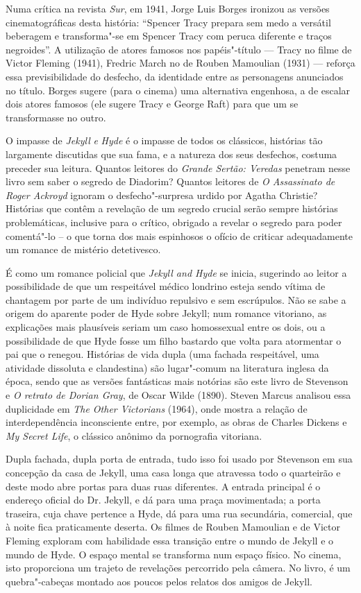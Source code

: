 Numa crítica na revista \textit{Sur}, em 1941, Jorge Luis Borges
ironizou as versões cinematográficas desta história: “Spencer Tracy
prepara sem medo a versátil beberagem e transforma"-se em Spencer Tracy
com peruca diferente e traços negroides”.  A utilização de atores
famosos nos papéis"-título --- Tracy no filme de Victor Fleming (1941),
Fredric March no de Rouben Mamoulian (1931) --- reforça essa
previsibilidade do desfecho, da identidade entre as personagens
anunciados no título. Borges sugere (para o cinema) uma alternativa
engenhosa, a de escalar dois atores famosos (ele sugere Tracy e George
Raft) para que um se transformasse no outro.  

O impasse de \textit{Jekyll }\textit{e}\textit{ Hyde} é o impasse de
todos os clássicos, histórias tão largamente discutidas que sua fama, e
a natureza dos seus desfechos, costuma preceder sua leitura.  Quantos
leitores do \textit{Grande Sertão: Veredas} penetram nesse livro sem
saber o segredo de Diadorim?  Quantos leitores de \textit{O Assassinato
de Roger Ackroyd} ignoram o desfecho"-surpresa urdido por Agatha
\mbox{Christie?}  Histórias que contêm a revelação de um segredo crucial serão
sempre histórias problemáticas, inclusive para o crítico, obrigado a
revelar o segredo para poder comentá"-lo – o que torna dos mais
espinhosos o ofício de criticar adequadamente um romance de mistério
detetivesco.

É como um romance policial que \textit{Jekyll and Hyde} se inicia,
sugerindo ao leitor a possibilidade de que um respeitável médico
londrino esteja sendo vítima de chantagem por parte de um indivíduo
repulsivo e sem escrúpulos.  Não se sabe a origem do aparente poder de
Hyde sobre Jekyll; num romance vitoriano, as explicações mais
plausíveis seriam um caso homossexual entre os dois, ou a possibilidade
de que Hyde fosse um filho bastardo que volta para atormentar o pai que
o renegou.  Histórias de vida dupla (uma fachada respeitável, uma
atividade dissoluta e clandestina) são lugar{}"-comum na literatura
inglesa da época, sendo que as versões fantásticas mais notórias são
este livro de Stevenson e \textit{O retrato de Dorian
Gray}, de Oscar Wilde (1890).  Steven Marcus analisou essa duplicidade
em \textit{The Other Victorians} (1964), onde mostra a relação de
interdependência inconsciente entre, por exemplo, as obras de Charles
Dickens e \textit{My Secret Life}, o clássico anônimo da pornografia
vitoriana. 

Dupla fachada, dupla porta de entrada, tudo isso foi usado por Stevenson
em sua concepção da casa de Jekyll, uma casa longa que atravessa todo o
quarteirão e deste modo abre portas para duas ruas diferentes.  A
entrada principal é o endereço oficial do Dr. Jekyll, e dá para uma
praça movimentada; a porta traseira, cuja chave pertence a Hyde, dá
para uma rua secundária, comercial, que à noite fica praticamente
deserta.  Os filmes de Rouben Mamoulian e de Victor Fleming exploram
com habilidade essa transição entre o mundo de Jekyll e o mundo de
Hyde.  O espaço mental se transforma num espaço físico. No cinema, isto
proporciona um trajeto de revelações percorrido pela câmera. No livro,
é um quebra"-cabeças montado aos poucos pelos relatos dos amigos de
Jekyll. 

